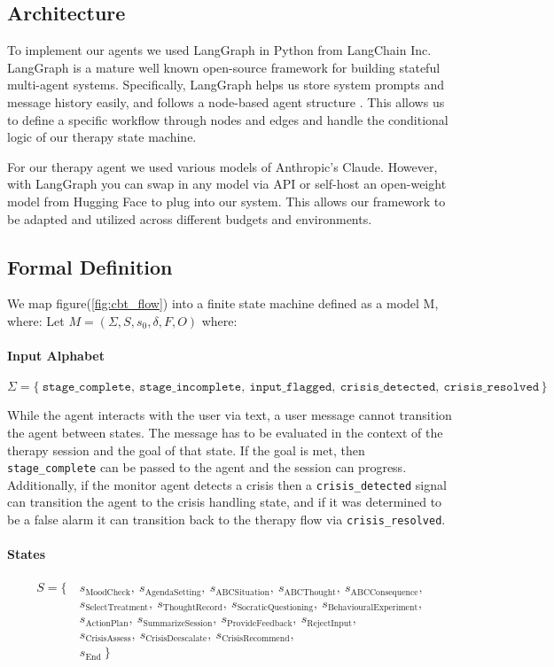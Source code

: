 \documentclass[twoside]{report}
\begin{document}
\subsection{Architecture}
To implement our agents we used LangGraph in Python from LangChain Inc. LangGraph is a mature well known open-source framework for building stateful multi-agent systems. Specifically, LangGraph helps us store system prompts and message history easily, and follows a node-based agent structure . This allows us to define a specific workflow through nodes and edges and handle the conditional logic of our therapy state machine.

For our therapy agent we used various models of Anthropic's Claude. However, with LangGraph you can swap in any model via API or self-host an open-weight model from Hugging Face to plug into our system. This allows our framework to be adapted and utilized across different budgets and environments.

\subsection {Formal Definition}
We map figure(\ref{fig:cbt_flow}) into a finite state machine defined as a model M, where:
Let $M = (\Sigma, S, s_0, \delta, F, O)$ where:
\paragraph{Input Alphabet}
\[
\Sigma = \{\ \texttt{stage\_complete},\ \texttt{stage\_incomplete},\
 \texttt{input\_flagged},\ \texttt{crisis\_detected},\ \texttt{crisis\_resolved} \,\}
\]

While the agent interacts with the user via text, a user message cannot transition the agent between states. The message has to be evaluated in the context of the therapy session and the goal of that state. If the goal is met, then \texttt{stage\_complete} can be passed to the agent and the session can progress. Additionally, if the monitor agent detects a crisis then a \texttt{crisis\_detected} signal can transition the agent to the crisis handling state, and if it was determined to be a false alarm it can transition back to the therapy flow via \texttt{crisis\_resolved}.

\paragraph{States}
\begin{align*}
S = \{\ &s_{\text{MoodCheck}},\ s_{\text{AgendaSetting}},\ s_{\text{ABCSituation}},\ s_{\text{ABCThought}},\ s_{\text{ABCConsequence}}, \\
        &s_{\text{SelectTreatment}},\ s_{\text{ThoughtRecord}},\ s_{\text{SocraticQuestioning}},\ s_{\text{BehaviouralExperiment}}, \\
        &s_{\text{ActionPlan}},\ s_{\text{SummarizeSession}},\ s_{\text{ProvideFeedback}},\ s_{\text{RejectInput}}, \\
        &s_{\text{CrisisAssess}},\ s_{\text{CrisisDeescalate}},\ s_{\text{CrisisRecommend}}, \\
        &s_{\text{End}}\ \}
\end{align*}
\end{document}
